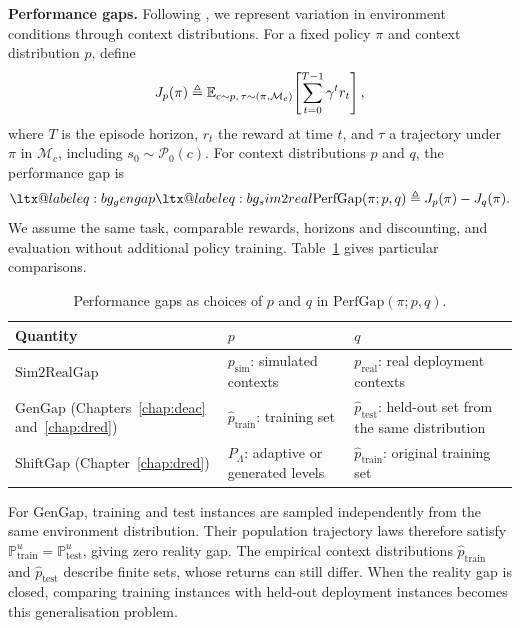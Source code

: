 \textbf{Performance gaps.} Following \citet{kirk2023survey}, we represent variation in environment conditions through context distributions. For a fixed policy $\pi$ and context distribution $p$, define
\begin{equation}\label{eq:bg_return}
    J_p(\pi) \triangleq \mathbb{E}_{c\sim p,\,\tau\sim(\pi,\mathcal{M}_c)}\!\left[\sum_{t=0}^{T-1}\gamma^t r_t\right],
\end{equation}
where $T$ is the episode horizon, $r_t$ the reward at time $t$, and $\tau$ a trajectory under $\pi$ in $\mathcal{M}_c$, including $s_0\sim\mathcal{P}_0(c)$. For context distributions $p$ and $q$, the performance gap is
\makeatletter
\begin{equation}\label{eq:bg_perfgap}
    \ltx@label{eq:bg_gengap}\ltx@label{eq:bg_sim2real}
    \text{PerfGap}(\pi;p,q) \triangleq J_p(\pi)-J_q(\pi).
\end{equation}
\makeatother
We assume the same task, comparable rewards, horizons and discounting, and evaluation without additional policy training. Table~\ref{tab:bg_gaps} gives particular comparisons.

\begin{table}[htbp]
\centering
\small
\caption{Performance gaps as choices of $p$ and $q$ in $\text{PerfGap}(\pi;p,q)$.}
\label{tab:bg_gaps}
\begin{tabularx}{\textwidth}{@{}>{\raggedright\arraybackslash}p{}>{\raggedright\arraybackslash}X>{\raggedright\arraybackslash}X@{}}
\toprule
\textbf{Quantity} & $p$ & $q$ \\
\midrule
$\text{Sim2RealGap}$ & $p_{\mathrm{sim}}$: simulated contexts & $p_{\mathrm{real}}$: real deployment contexts \\
\addlinespace
$\text{GenGap}$ (Chapters~\ref{chap:deac} and~\ref{chap:dred}) & $\widehat p_{\mathrm{train}}$: training set & $\widehat p_{\mathrm{test}}$: held-out set from the same distribution \\
\addlinespace
$\text{ShiftGap}$ (Chapter~\ref{chap:dred}) & $P_\Lambda$: adaptive or generated levels & $\widehat p_{\mathrm{train}}$: original training set \\
\bottomrule
\end{tabularx}
\end{table}

For $\text{GenGap}$, training and test instances are sampled independently from the same environment distribution. Their population trajectory laws therefore satisfy $\mathbb{P}_{\mathrm{train}}^u=\mathbb{P}_{\mathrm{test}}^u$, giving zero reality gap. The empirical context distributions $\widehat p_{\mathrm{train}}$ and $\widehat p_{\mathrm{test}}$ describe finite sets, whose returns can still differ. When the reality gap is closed, comparing training instances with held-out deployment instances becomes this generalisation problem.

